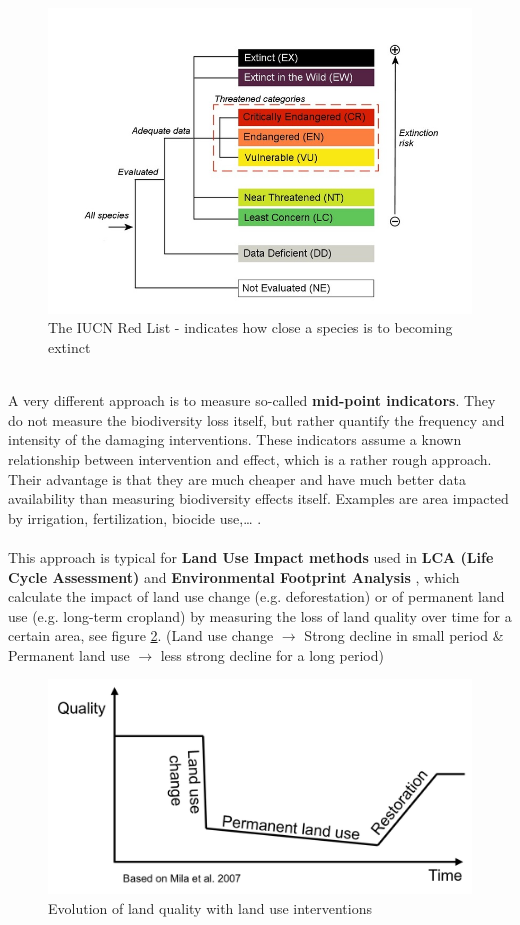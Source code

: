 \documentclass[../summary.tex]{subfiles}
\begin{document}
	\begin{figure}[H]
		\centering
		\includegraphics[width=0.6\linewidth]{../images/2-IUCN-red-list}
		\caption{The IUCN Red List - indicates how close a species is to becoming extinct}
		\label{fig:iucn-red-list}
	\end{figure}
	
	\newpage
	\ \\
	A very different approach is to measure so-called \textbf{mid-point indicators}. They do not measure the biodiversity loss itself, but rather quantify the frequency and intensity of the damaging interventions. These indicators assume a known relationship between intervention and effect, which is a rather rough approach. Their advantage is that they are much cheaper and have much better data availability than measuring biodiversity effects itself. Examples are area impacted by irrigation, fertilization, biocide use,… .
	\\
	\\
	This approach is typical for \textbf{Land Use Impact methods} used in \textbf{LCA (Life Cycle Assessment)} and \textbf{Environmental Footprint Analysis} , which calculate the impact of land use change (e.g. deforestation) or of permanent land use (e.g. long-term cropland) by measuring the loss of land quality over time for a certain area, see figure \ref{fig:mid-point-indicator}.
	(Land use change $\rightarrow$ Strong decline in small period \& Permanent land use $\rightarrow$ less strong decline for a long
	period)	
	\begin{figure}[H]
		\centering
		\includegraphics[width=0.6\linewidth]{../images/2-mid-point-indicator}
		\caption{Evolution of land quality with land use interventions}
		\label{fig:mid-point-indicator}
	\end{figure}
	
\end{document}

